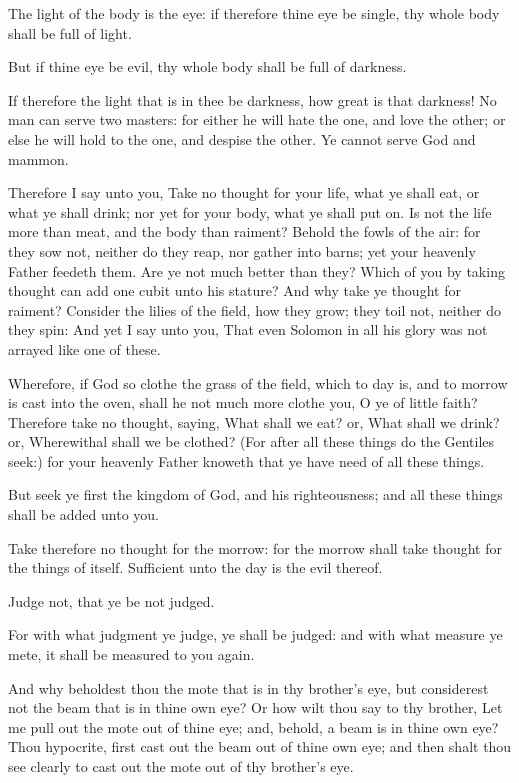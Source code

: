 \Verse The light of the body is the eye: if therefore thine eye be single, thy whole body shall be full of light.

\Verse But if thine eye be evil, thy whole body shall be full of darkness.

If therefore the light that is in thee be darkness, how great is that darkness!  \Verse No man can serve two masters: for either he will hate the one, and love the other; or else he will hold to the one, and despise the other. Ye cannot serve God and mammon.

\Verse Therefore I say unto you, Take no thought for your life, what ye shall eat, or what ye shall drink; nor yet for your body, what ye shall put on. Is not the life more than meat, and the body than raiment?  \Verse Behold the fowls of the air: for they sow not, neither do they reap, nor gather into barns; yet your heavenly Father feedeth them. Are ye not much better than they?  \Verse Which of you by taking thought can add one cubit unto his stature?  \Verse And why take ye thought for raiment? Consider the lilies of the field, how they grow; they toil not, neither do they spin: \Verse And yet I say unto you, That even Solomon in all his glory was not arrayed like one of these.

\Verse Wherefore, if God so clothe the grass of the field, which to day is, and to morrow is cast into the oven, shall he not much more clothe you, O ye of little faith?  \Verse Therefore take no thought, saying, What shall we eat? or, What shall we drink? or, Wherewithal shall we be clothed?  \Verse (For after all these things do the Gentiles seek:) for your heavenly Father knoweth that ye have need of all these things.

\Verse But seek ye first the kingdom of God, and his righteousness; and all these things shall be added unto you.

\Verse Take therefore no thought for the morrow: for the morrow shall take thought for the things of itself. Sufficient unto the day is the evil thereof.


\Chapter
\Verse Judge not, that ye be not judged.

\Verse For with what judgment ye judge, ye shall be judged: and with what measure ye mete, it shall be measured to you again.

\Verse And why beholdest thou the mote that is in thy brother's eye, but considerest not the beam that is in thine own eye?  \Verse Or how wilt thou say to thy brother, Let me pull out the mote out of thine eye; and, behold, a beam is in thine own eye?  \Verse Thou hypocrite, first cast out the beam out of thine own eye; and then shalt thou see clearly to cast out the mote out of thy brother's eye.

